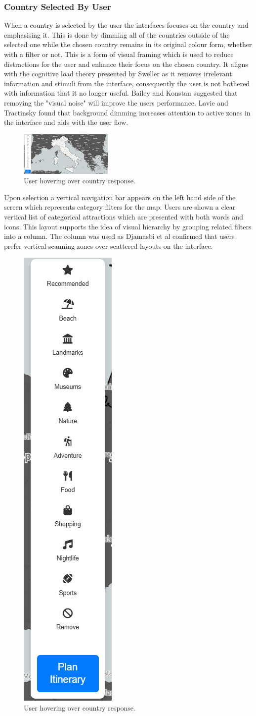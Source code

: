 \documentclass[]{project_final}
\begin{document}
\subsubsection{Country Selected By User}
When a country is selected by the user the interfaces focuses on the country and emphasising it. This is done by dimming all of the countries outside of the selected one while the chosen country remains in its original colour form, whether with a filter or not. This is a form of visual framing which is used to reduce distractions for the user and enhance their focus on the chosen country.
It aligns with the cognitive load theory presented by Sweller as it removes irrelevant information and stimuli from the interface, consequently the user is not bothered with information that it no longer useful. Bailey and Konstan suggested that removing the "visual noise" will improve the users performance. Lavie and Tractinsky found that background dimming increases attention to active zones in the interface and aids with the user flow.

\begin{figure}[ht!]
  \centering
  \includegraphics[width=0.4\textwidth]{9.png}
  \caption{User hovering over country response.}
  \label{fig:1}
\end{figure}

Upon selection a vertical navigation bar appears on the left hand side of the screen which represents category filters for the map. Users are shown a clear vertical list of categorical attractions which are presented with both words and icons. This layout supports the idea of visual hierarchy by grouping related filters into a column. The column was used as Djamasbi et al confirmed that users prefer vertical scanning zones over scattered layouts on the interface.

\begin{figure}[ht!]
  \centering
  \includegraphics[height=0.4\textwidth]{Vertical filters.png}
  \caption{User hovering over country response.}
  \label{fig:1}
\end{figure}
\end{document}
